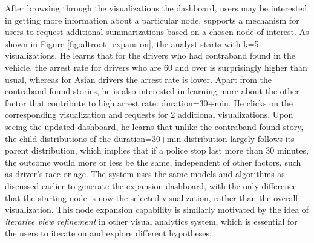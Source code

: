 \par After browsing through the visualizations the dashboard, users may be interested in getting more information about a particular node. \system supports a mechanism for users to request additional summarizations based on a chosen node of interest. As shown in Figure \ref{fig:altroot_expansion}, the analyst starts with k=5 visualizations. He learns that for the drivers who had contraband found in the vehicle, the arrest rate for drivers who are 60 and over is surprisingly higher than usual, whereas for Asian drivers the arrest rate is lower. Apart from the contraband found stories, he is also interested in learning more about the other factor that contribute to high arrest rate: duration=30+min. He clicks on the corresponding visualization and requests for 2 additional visualizations. Upon seeing the updated dashboard, he learns that unlike the contraband found story, the child distributions of the duration=30+min distribution largely follows its parent distribution, which implies that if a police stop last more than 30 minutes, the outcome would more or less be the same, independent of other factors, such as driver's race or age. The system uses the same models and algorithms as discussed earlier to generate the expansion dashboard, with the only difference that the starting node is now the selected visualization, rather than the overall visualization. This node expansion capability is similarly motivated by the idea of \textit{iterative view refinement} in other visual analytics system\cite{Wongsuphasawat2016,Hoque2017}, which is essential for the users to iterate on and explore different hypotheses. 
